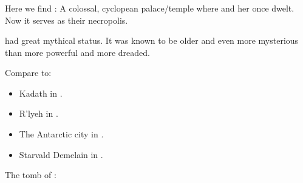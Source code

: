 \subsubsection{\Baltherium}
\index{\Baltherium}
Here we find \Baltherium: 
A colossal, cyclopean palace/temple where \Tiamat{} and her \firstgendragons{} once dwelt. 
Now it serves as their necropolis. 

\Baltherium had great mythical status.
It was known to be older and even more mysterious than \dash more powerful and more dreaded.

Compare to:

\begin{itemize}
  \item Kadath in \cite{HPLovecraft:TheDreamQuestofUnknownKadath}.
  \item R'lyeh in \cite{HPLovecraft:TheCallofCthulhu}. 
  \item The Antarctic city in \cite{HPLovecraft:AttheMountainsofMadness}. 
  \item Starvald Demelain in \cite{StevenErikson:ReapersGale}. 
\end{itemize}


The tomb of \Sethicus: 

